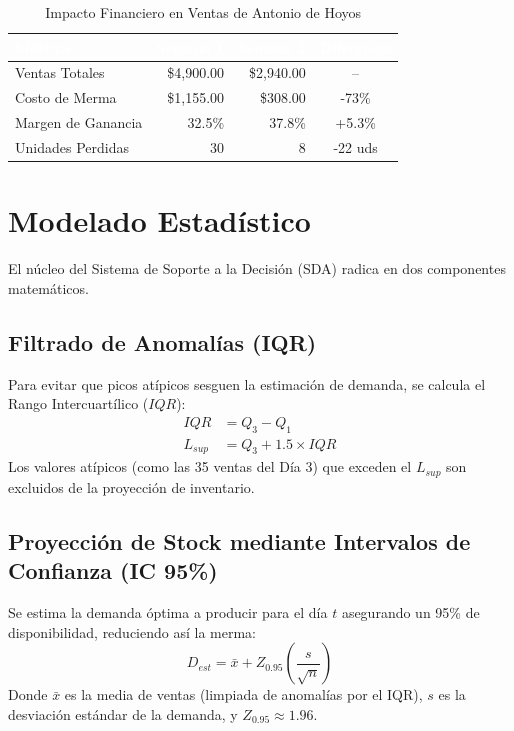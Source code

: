 \documentclass[12pt, a4paper]{article}
\begin{document}
\begin{table}[H]
\centering
\caption{Impacto Financiero en Ventas de Antonio de Hoyos}
\begin{tabular}{l r r c}
\toprule
\rowcolor{tableheader}
\textcolor{white}{\textbf{Métrica}} & \textcolor{white}{\textbf{Semana 1}} & \textcolor{white}{\textbf{Semana 2}} & \textcolor{white}{\textbf{Diferencia}} \\
\midrule
Ventas Totales & \$4,900.00 & \$2,940.00 & -- \\
\rowcolor{lightgray}
Costo de Merma & \$1,155.00 & \$308.00 & \textcolor{accentgreen}{-73\%} \\
Margen de Ganancia & 32.5\% & 37.8\% & \textcolor{accentgreen}{+5.3\%} \\
\rowcolor{lightgray}
Unidades Perdidas & 30 & 8 & \textcolor{accentgreen}{-22 uds} \\
\bottomrule
\end{tabular}
\end{table}

\section{Modelado Estadístico}

El núcleo del Sistema de Soporte a la Decisión (SDA) radica en dos componentes matemáticos.

\subsection{Filtrado de Anomalías (IQR)}
Para evitar que picos atípicos sesguen la estimación de demanda, se calcula el Rango Intercuartílico ($IQR$):
\begin{align*}
    IQR &= Q_3 - Q_1 \\
    L_{sup} &= Q_3 + 1.5 \times IQR
\end{align*}
Los valores atípicos (como las 35 ventas del Día 3) que exceden el $L_{sup}$ son excluidos de la proyección de inventario.

\subsection{Proyección de Stock mediante Intervalos de Confianza (IC 95\%)}
Se estima la demanda óptima a producir para el día $t$ asegurando un 95\% de disponibilidad, reduciendo así la merma:
\begin{equation}
    D_{est} = \bar{x} + Z_{0.95} \left( \frac{s}{\sqrt{n}} \right)
\end{equation}
Donde $\bar{x}$ es la media de ventas (limpiada de anomalías por el IQR), $s$ es la desviación estándar de la demanda, y $Z_{0.95} \approx 1.96$.
\end{document}
